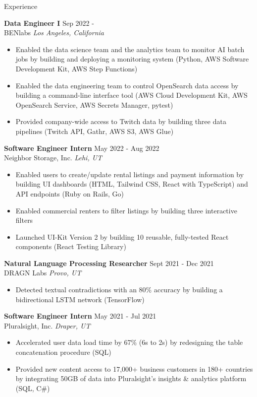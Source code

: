 \documentclass{resume} %
\begin{document}
\begin{rSection}{Experience}

\textbf{Data Engineer I} \hfill Sep 2022 - \\
BENlabs \hfill \textit{Los Angeles, California}
\begin{itemize}
   \itemsep -2pt {} 
   \item Enabled the data science team and the analytics team to monitor AI batch jobs by 
   building and deploying a monitoring system (Python, AWS Software Development Kit, AWS Step Functions)
   \item Enabled the data engineering team to control OpenSearch data access by 
   building a command-line interface tool (AWS Cloud Development Kit, AWS OpenSearch Service, AWS Secrets Manager, pytest)
   \item Provided company-wide access to Twitch data by building three data pipelines (Twitch API, Gathr, AWS S3, AWS Glue)
\end{itemize}
 
\textbf{Software Engineer Intern} \hfill May 2022 - Aug 2022\\
Neighbor Storage, Inc. \hfill \textit{Lehi, UT}
 \begin{itemize}
    \itemsep -2pt {} 
    \item Enabled users to create/update rental listings and payment information by building 
    UI dashboards (HTML, Tailwind CSS, React with TypeScript) and API endpoints (Ruby on Rails, 
    Go)
    \item Enabled commercial renters to filter listings by building three interactive filters
    \item Launched UI-Kit Version 2 by building 10 reusable, fully-tested React components 
    (React Testing Library)
 \end{itemize}

\textbf{Natural Language Processing Researcher} \hfill Sept 2021 - Dec 2021\\
DRAGN Labs \hfill \textit{Provo, UT}
 \begin{itemize}
    \itemsep -2pt {} 
    \item Detected textual contradictions with an 80\% accuracy by building a bidirectional LSTM network (TensorFlow)
 \end{itemize}

\textbf{Software Engineer Intern} \hfill May 2021 - Jul 2021\\
Pluralsight, Inc. \hfill \textit{Draper, UT}
 \begin{itemize}
    \itemsep -2pt {} 
    \item Accelerated user data load time by 67\% (6s to 2s) by redesigning the table 
    concatenation procedure (SQL)
    \item Provided new content access to 17,000+ business customers in 180+ countries by 
    integrating 50GB of data into Pluralsight's insights \& analytics platform (SQL, C\#)
 \end{itemize}


\end{rSection}
\end{document}
